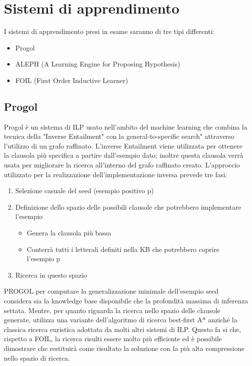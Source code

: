 \section{Sistemi di apprendimento}

I sistemi di apprendimento presi in esame saranno di tre tipi differenti:

\begin{itemize}
	\item Progol 
	\item ALEPH (A Learning Engine for Proposing Hypothesis)
	\item FOIL (First Order Inductive Learner)
\end{itemize}

\subsection{Progol}
Progol è un sistema di ILP usato nell'ambito del machine learning che combina la tecnica della "Inverse Entailment" con la general-to-specific search" attraverso l'utilizzo di un grafo raffinato.
L'inverse Entailment viene utilizzata per ottenere la clausola più specifica a partire dall'esempio dato; inoltre questa clausola verrà usata per migliorare la ricerca all'interno del grafo raffinato creato.
L'approccio utilizzato per la realizzazione dell'implementazione inversa prevede tre fasi:
\begin{enumerate}
\item Selezione casuale del seed (esempio positivo p)
\item Definizione dello spazio delle possibili clausole che potrebbero implementare l'esempio
	\begin{itemize}
		\item Genera la clausola più bassa
		\item Conterrà tutti i letterali definiti nella KB che potrebbero coprire l'esempio p
	\end{itemize}
\item Ricerca in questo spazio 
\end{enumerate}
PROGOL per computare la generalizzazione minimale dell'esempio seed considera sia la knowledge base disponibile che la profondità massima di inferenza settata. Mentre, per quanto riguarda la ricerca nello spazio delle clausole generate, utilizza una variante dell'algoritmo di ricerca best-first A* anziché la classica ricerca euristica adottata da molti altri sistemi di ILP. Questo fa si che, rispetto a FOIL, la ricerca risulti essere molto più efficiente ed è possibile dimostrare che restituirà come risultato la soluzione con la più alta compressione nello spazio di ricerca.
\nocite{wiki:progol}

